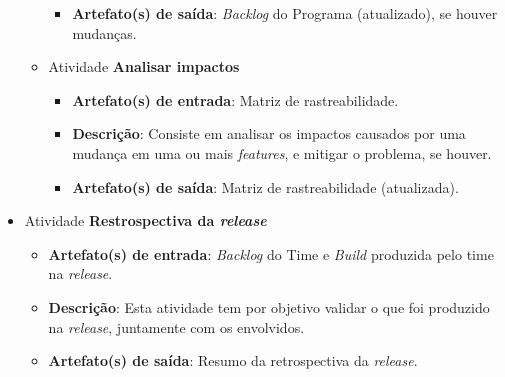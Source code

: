\begin{itemize}
\begin{itemize}
\begin{itemize}
	      \item \textbf{Artefato(s) de saída}: \textit{Backlog} do Programa (atualizado), se houver mudanças.
		    
	    \end{itemize}
	    
	 \item Atividade \textbf{Analisar impactos}
	    
	    \begin{itemize}
	      \item \textbf{Artefato(s) de entrada}: Matriz de rastreabilidade.

	      \item \textbf{Descrição}: Consiste em analisar os impactos causados por uma mudança em uma ou mais
		\textit{features}, e mitigar o problema, se houver.
	      
	      \item \textbf{Artefato(s) de saída}: Matriz de rastreabilidade (atualizada).
		    
	    \end{itemize}
	    
	\end{itemize}
	
     \item Atividade \textbf{Restrospectiva da \textit{release}}
      
	  \begin{itemize}
	    \item \textbf{Artefato(s) de entrada}: \textit{Backlog} do Time e 
	      \textit{Build} produzida pelo time na \textit{release}.
	    
	    \item \textbf{Descrição}: Esta atividade tem por objetivo validar o que foi produzido na \textit{release},
	      juntamente com os envolvidos.
	    
	    \item \textbf{Artefato(s) de saída}: Resumo da retrospectiva da \textit{release}.
		  
	  \end{itemize}
     
    \end{itemize}
    
    \vfill